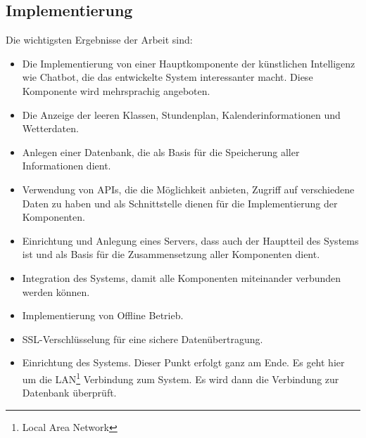 \subsection{Implementierung}
Die wichtigsten Ergebnisse der Arbeit sind: 
\begin{itemize}
	\item Die Implementierung von einer Hauptkomponente der künstlichen Intelligenz wie Chatbot, die das entwickelte System interessanter macht. Diese Komponente wird mehrsprachig angeboten.
\end{itemize}
\begin{itemize}
	\item Die Anzeige der leeren Klassen, Stundenplan, Kalenderinformationen und Wetterdaten.
\end{itemize}
\begin{itemize}
	\item Anlegen einer Datenbank, die als Basis für die Speicherung aller Informationen dient.
\end{itemize}
\begin{itemize}
	\item Verwendung von APIs, die die Möglichkeit anbieten, Zugriff auf verschiedene Daten zu haben und als Schnittstelle dienen für die Implementierung der Komponenten.
\end{itemize}
\begin{itemize}
	\item 
	Einrichtung und Anlegung eines Servers, dass auch der Hauptteil des Systems ist und als Basis für die Zusammensetzung aller Komponenten dient.
\end{itemize}
\begin{itemize}
	\item 
	Integration des Systems, damit alle Komponenten miteinander verbunden werden können.
\end{itemize}
\begin{itemize}
	\item 
	Implementierung von Offline Betrieb.
\end{itemize}
\begin{itemize}
	\item 
	SSL-Verschl\"usselung f\"ur eine sichere Daten\"ubertragung.
\end{itemize}
\begin{itemize}
	\item 
	Einrichtung des Systems. Dieser Punkt erfolgt ganz am Ende. Es geht hier um die LAN\footnote{Local Area Network} Verbindung zum System. Es wird dann die Verbindung zur Datenbank \"uberpr\"uft. 
\end{itemize}
